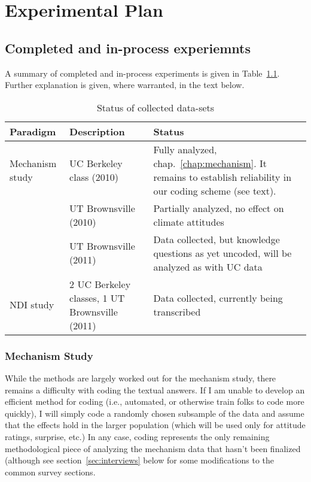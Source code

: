 \graphicspath{{experimental-description/}}

\chapter{Experimental Plan}

\section{Completed and in-process experiemnts}

A summary of completed and in-process experiments is given in
Table~\ref{table:collected}. Further explanation is given, where warranted, in
the text below.

\begin{table}
\begin{tabular}{lp{}p{}}
Paradigm & Description & Status \\ 
\hline \hline
Mechanism study 
    & UC Berkeley class (2010) & Fully analyzed, chap.~\ref{chap:mechanism}. It
    remains to establish reliability in our coding scheme (see text). \\
    & UT Brownsville (2010) & Partially analyzed, no effect on climate attitudes \\
    & UT Brownsville (2011) & Data collected, but knowledge questions as yet
        uncoded, will be analyzed as with UC data \\

NDI study 
    & 2 UC Berkeley classes, 1 UT Brownsville (2011) & Data collected, currently
        being transcribed \\
\hline
\end{tabular}
\caption{Status of collected data-sets}
\label{table:collected}
\end{table}


\subsection{Mechanism Study}

While the methods are largely worked out for the mechanism study, there remains
a difficulty with coding the textual answers. If I am unable to develop an
efficient method for coding (i.e., automated, or otherwise train folks to code
more quickly), I will simply code a randomly chosen subsample of the data and
assume that the effects hold in the larger population (which will be used only
for attitude ratings, surprise, etc.) In any case, coding represents the only
remaining methodological piece of analyzing the mechanism data that hasn't been
finalized (although see section~\ref{sec:interviews} below for some
modifications to the common survey sections.

